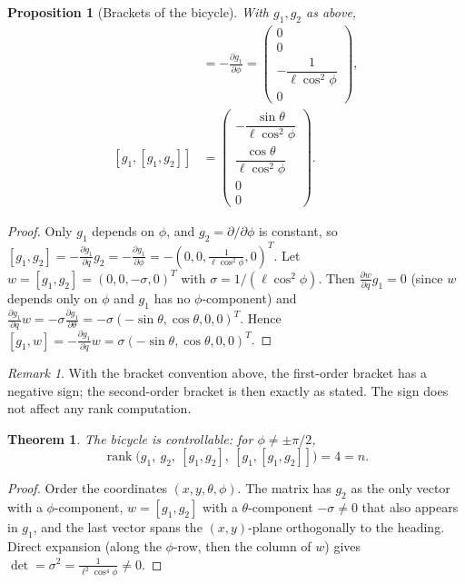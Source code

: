 \documentclass[11pt,a4paper]{article}
\DeclareMathOperator{\rank}{rank}
\newcommand{\LB}[2]{[#1,#2]}
\theoremstyle{definition}
\theoremstyle{plain}
\newtheorem{theorem}[definition]{Theorem}
\newtheorem{proposition}[definition]{Proposition}
\theoremstyle{remark}
\newtheorem*{remark}{Remark}
\begin{document}
\begin{proposition}[Brackets of the bicycle]
\label{prop:bicyclebr}
With $g_1,g_2$ as above,
\begin{align*}
\LB{g_1}{g_2}&=-\frac{\partial g_1}{\partial\phi}=\begin{pmatrix}0\\0\\-\dfrac{1}{\ell\cos^2\phi}\\0\end{pmatrix},\\
\LB{g_1}{\LB{g_1}{g_2}}&=\begin{pmatrix}-\dfrac{\sin\theta}{\ell\cos^2\phi}\\[6pt]\dfrac{\cos\theta}{\ell\cos^2\phi}\\0\\0\end{pmatrix}.
\end{align*}
\end{proposition}
\begin{proof}
Only $g_1$ depends on $\phi$, and $g_2=\partial/\partial\phi$ is constant, so $\LB{g_1}{g_2}=-\frac{\partial g_1}{\partial q}g_2=-\frac{\partial g_1}{\partial\phi}=-(0,0,\frac{1}{\ell\cos^2\phi},0)^T$. Let $w=\LB{g_1}{g_2}=(0,0,-\sigma,0)^T$ with $\sigma=1/(\ell\cos^2\phi)$. Then $\frac{\partial w}{\partial q}g_1=0$ (since $w$ depends only on $\phi$ and $g_1$ has no $\phi$-component) and $\frac{\partial g_1}{\partial q}w=-\sigma\frac{\partial g_1}{\partial\theta}=-\sigma(-\sin\theta,\cos\theta,0,0)^T$. Hence $\LB{g_1}{w}=-\frac{\partial g_1}{\partial q}w=\sigma(-\sin\theta,\cos\theta,0,0)^T$.
\end{proof}

\begin{remark}
With the bracket convention above, the first-order bracket has a negative sign; the second-order bracket is then exactly as stated. The sign does not affect any rank computation.
\end{remark}

\begin{theorem}
The bicycle is controllable: for $\phi\ne\pm\pi/2$,
\[
\rank\big(g_1,\ g_2,\ \LB{g_1}{g_2},\ \LB{g_1}{\LB{g_1}{g_2}}\big)=4=n .
\]
\end{theorem}
\begin{proof}
Order the coordinates $(x,y,\theta,\phi)$. The matrix has $g_2$ as the only vector with a $\phi$-component, $w=\LB{g_1}{g_2}$ with a $\theta$-component $-\sigma\neq0$ that also appears in $g_1$, and the last vector spans the $(x,y)$-plane orthogonally to the heading. Direct expansion (along the $\phi$-row, then the column of $w$) gives $\det=\sigma^2=\frac{1}{\ell^2\cos^4\phi}\ne0$.
\end{proof}
\end{document}
